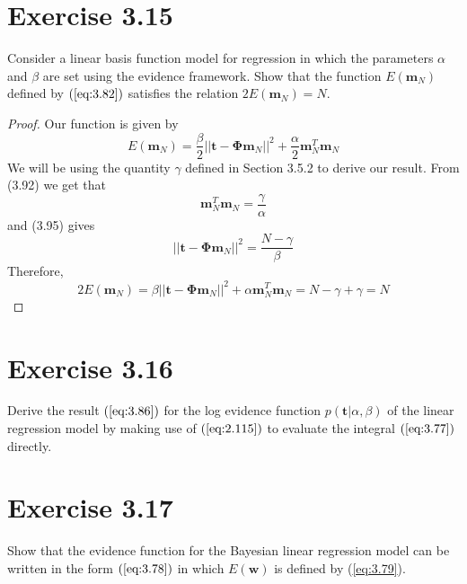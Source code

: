 \section*{Exercise 3.15}
Consider a linear basis function model for regression in which the parameters
$\alpha$ and $\beta$ are set using the evidence framework. Show that the
function $E(\mathbf{m}_N)$ defined by $(\ref{eq:3.82})$ satisfies the relation
$2E(\mathbf{m}_N) = N$.

\vspace{1em}

\begin{proof}
    Our function is given by
    \begin{equation}\label{eq:3.82}\tag{3.82}
        E(\mathbf{m}_N) = \frac{\beta}{2} ||\mathbf{t} - \mathbf{\Phi}\mathbf{m}_N||^2
        + \frac{\alpha}{2} \mathbf{m}_N^T\mathbf{m}_N
    \end{equation}
    We will be using the quantity $\gamma$ defined in Section 3.5.2 to 
    derive our result. From (3.92) we get that
     \[
         \mathbf{m}_N^T\mathbf{m}_N = \frac{\gamma}{\alpha}
    \] 
    and (3.95) gives
    \[
        ||\mathbf{t} - \mathbf{\Phi}\mathbf{m}_N||^2 = \frac{N - \gamma}{\beta}
    \] 
    Therefore,
    \[
        2E(\mathbf{m}_N) 
        = \beta||\mathbf{t} - \mathbf{\Phi}\mathbf{m}_N||^2 + \alpha\mathbf{m}_N^T\mathbf{m}_N
        = N - \gamma + \gamma = N
    \] 
\end{proof}

\section*{Exercise 3.16}
Derive the result $(\ref{eq:3.86})$ for the log evidence
function $p(\mathbf{t} | \alpha, \beta)$ of the linear
regression model by making use of $(\ref{eq:2.115})$ to
evaluate the integral $(\ref{eq:3.77})$ directly.

\section*{Exercise 3.17}
Show that the evidence function for the Bayesian linear regression
model can be written in the form $(\ref{eq:3.78})$ in which
$E(\mathbf{w})$ is defined by (\ref{eq:3.79}).

\vspace{1em}


